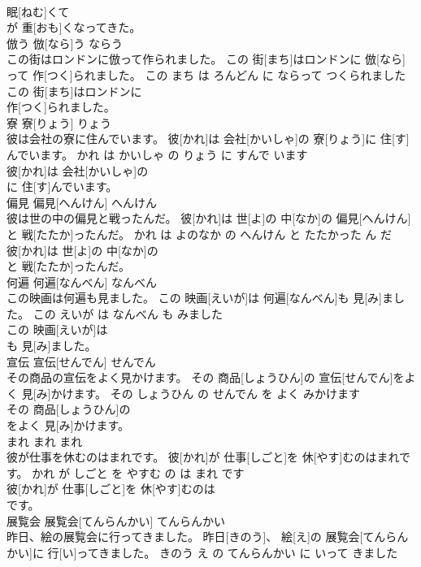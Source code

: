 \documentclass[8pt]{extreport}
\begin{document}
\begin{CJK}{UTF8}{min}
\\	眠[ねむ]くて
\\	が 重[おも]くなってきた。			
\\	倣う	倣[なら]う	ならう	
\\	この街はロンドンに倣って作られました。	この 街[まち]はロンドンに 倣[なら]って 作[つく]られました。	この まち は ろんどん に ならって つくられました	
\\	この 街[まち]はロンドンに
\\	作[つく]られました。			
\\	寮	寮[りょう]	りょう	
\\	彼は会社の寮に住んでいます。	彼[かれ]は 会社[かいしゃ]の 寮[りょう]に 住[す]んでいます。	かれ は かいしゃ の りょう に すんで います	
\\	彼[かれ]は 会社[かいしゃ]の
\\	に 住[す]んでいます。			
\\	偏見	偏見[へんけん]	へんけん	
\\	彼は世の中の偏見と戦ったんだ。	彼[かれ]は 世[よ]の 中[なか]の 偏見[へんけん]と 戦[たたか]ったんだ。	かれ は よのなか の へんけん と たたかった ん だ	
\\	彼[かれ]は 世[よ]の 中[なか]の
\\	と 戦[たたか]ったんだ。			
\\	何遍	何遍[なんべん]	なんべん	
\\	この映画は何遍も見ました。	この 映画[えいが]は 何遍[なんべん]も 見[み]ました。	この えいが は なんべん も みました	
\\	この 映画[えいが]は
\\	も 見[み]ました。			
\\	宣伝	宣伝[せんでん]	せんでん	
\\	その商品の宣伝をよく見かけます。	その 商品[しょうひん]の 宣伝[せんでん]をよく 見[み]かけます。	その しょうひん の せんでん を よく みかけます	
\\	その 商品[しょうひん]の
\\	をよく 見[み]かけます。			
\\	まれ	まれ	まれ	
\\	彼が仕事を休むのはまれです。	彼[かれ]が 仕事[しごと]を 休[やす]むのはまれです。	かれ が しごと を やすむ の は まれ です	
\\	彼[かれ]が 仕事[しごと]を 休[やす]むのは
\\	です。			
\\	展覧会	展覧会[てんらんかい]	てんらんかい	
\\	昨日、絵の展覧会に行ってきました。	昨日[きのう]、 絵[え]の 展覧会[てんらんかい]に 行[い]ってきました。	きのう え の てんらんかい に いって きました	

\end{CJK}
\end{document}
